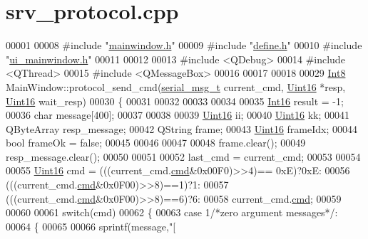 \hypertarget{a00136_source}{\section{srv\+\_\+protocol.\+cpp}
\label{a00136_source}
}

\begin{DoxyCode}
00001 
00008 \textcolor{preprocessor}{#include "\hyperlink{a00110}{mainwindow.h}"}
00009 \textcolor{preprocessor}{#include "\hyperlink{a00090}{define.h}"}
00010 \textcolor{preprocessor}{#include "\hyperlink{a00139}{ui\_mainwindow.h}"}
00011 
00012 
00013 \textcolor{preprocessor}{#include <QDebug>}
00014 \textcolor{preprocessor}{#include <QThread>}
00015 \textcolor{preprocessor}{#include <QMessageBox>}
00016 
00017 
00018 
00029 \hyperlink{a00004_aafb609548b1aa0152c46f9205b79d0f0}{Int8} MainWindow::protocol\_send\_cmd(\hyperlink{a00004_d3/dd5/a00215}{serial\_msg\_t} current\_cmd, 
      \hyperlink{a00004_aae7407b021d43f7193a81a58cfb3e297}{Uint16} *resp, \hyperlink{a00004_aae7407b021d43f7193a81a58cfb3e297}{Uint16} wait\_resp)
00030 \{
00031 
00032 
00033 
00034 
00035    \hyperlink{a00004_a3985266aecb120f269789241c170850c}{Int16}   result = -1;
00036    \textcolor{keywordtype}{char}    message[400];
00037 
00038 
00039    \hyperlink{a00004_aae7407b021d43f7193a81a58cfb3e297}{Uint16}  ii;
00040    \hyperlink{a00004_aae7407b021d43f7193a81a58cfb3e297}{Uint16}  kk;
00041    QByteArray resp\_message;
00042    QString frame;
00043    \hyperlink{a00004_aae7407b021d43f7193a81a58cfb3e297}{Uint16}  frameIdx;
00044    \textcolor{keywordtype}{bool} frameOk = \textcolor{keyword}{false};
00045 
00046 
00047 
00048    frame.clear();
00049    resp\_message.clear();
00050 
00051 
00052    last\_cmd = current\_cmd;
00053 
00054 
00055    \hyperlink{a00004_aae7407b021d43f7193a81a58cfb3e297}{Uint16} cmd = (((current\_cmd.\hyperlink{a00004_af20664dc9ca2b752c73d524edee0e07a}{cmd}&0x00F0)>>4)== 0xE)?0xE:
00056                 (((current\_cmd.\hyperlink{a00004_af20664dc9ca2b752c73d524edee0e07a}{cmd}&0x0F00)>>8)==1)?1:
00057                 (((current\_cmd.\hyperlink{a00004_af20664dc9ca2b752c73d524edee0e07a}{cmd}&0x0F00)>>8)==6)?6:            
00058                 current\_cmd.\hyperlink{a00004_af20664dc9ca2b752c73d524edee0e07a}{cmd};
00059 
00060 
00061  \textcolor{keywordflow}{switch}(cmd)
00062    \{
00063        \textcolor{keywordflow}{case} 1\textcolor{comment}{/*zero argument messages*/}:
00064        \{
00065 
00066        sprintf(message,\textcolor{stringliteral}{"[%
}
\end{DoxyCode}
